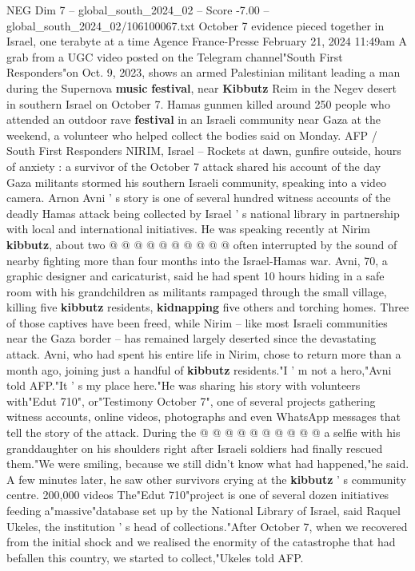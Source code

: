 \begin{textsample}{NEG Dim 7 – global\_south\_2024\_02 – Score -7.00 – global\_south\_2024\_02/106100067.txt}  \label{ex:f7_neg_391}
October 7 evidence pieced together in Israel, one terabyte at a time Agence France-Presse February 21, 2024 11:49am A grab from a UGC video posted on the Telegram channel"South First Responders"on Oct. 9, 2023, shows an armed Palestinian militant leading a man during the Supernova \textbf{music} \textbf{festival}, near \textbf{Kibbutz} Reim in the Negev desert in southern Israel on October 7.
Hamas gunmen killed around 250 people who attended an outdoor rave \textbf{festival} in an Israeli community near Gaza at the weekend, a volunteer who helped collect the bodies said on Monday.
AFP / South First Responders NIRIM, Israel -- Rockets at dawn, gunfire outside, hours of anxiety : a survivor of the October 7 attack shared his account of the day Gaza militants stormed his southern Israeli community, speaking into a video camera.
Arnon Avni ' s story is one of several hundred witness accounts of the deadly Hamas attack being collected by Israel ' s national library in partnership with local and international initiatives.
He was speaking recently at Nirim \textbf{kibbutz}, about two @ @ @ @ @ @ @ @ @ @ often interrupted by the sound of nearby fighting more than four months into the Israel-Hamas war.
Avni, 70, a graphic designer and caricaturist, said he had spent 10 hours hiding in a safe room with his grandchildren as militants rampaged through the small village, killing five \textbf{kibbutz} residents, \textbf{kidnapping} five others and torching homes.
Three of those captives have been freed, while Nirim -- like most Israeli communities near the Gaza border -- has remained largely deserted since the devastating attack.
Avni, who had spent his entire life in Nirim, chose to return more than a month ago, joining just a handful of \textbf{kibbutz} residents."I ' m not a hero,"Avni told AFP."It ' s my place here."He was sharing his story with volunteers with"Edut 710", or"Testimony October 7", one of several projects gathering witness accounts, online videos, photographs and even WhatsApp messages that tell the story of the attack.
During the @ @ @ @ @ @ @ @ @ @ a selfie with his granddaughter on his shoulders right after Israeli soldiers had finally rescued them."We were smiling, because we still didn't know what had happened,"he said.
A few minutes later, he saw other survivors crying at the \textbf{kibbutz} ' s community centre. 200,000 videos The"Edut 710"project is one of several dozen initiatives feeding a"massive"database set up by the National Library of Israel, said Raquel Ukeles, the institution ' s head of collections."After October 7, when we recovered from the initial shock and we realised the enormity of the catastrophe that had befallen this country, we started to collect,"Ukeles told AFP.

\end{textsample}
